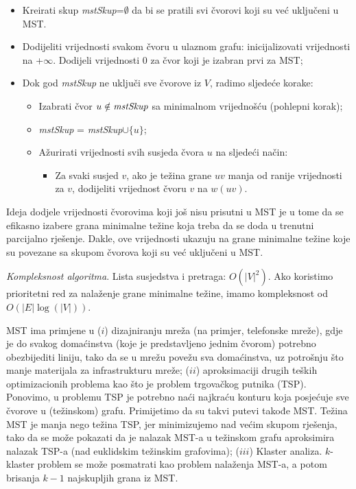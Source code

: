 \documentclass[a4paper, utf8, 11pt, colorlinks]{book}
\begin{document}
\begin{itemize}
	\item Kreirati skup \emph{mstSkup}=$\emptyset$ da bi se pratili svi čvorovi koji su već uključeni u MST.
	\item Dodijeliti vrijednosti svakom čvoru u ulaznom grafu: inicijalizovati vrijednosti na +$\infty$. 
	      Dodijeli vrijednosti 0 za čvor koji je izabran prvi za MST;
	\item Dok god \emph{mstSkup} ne uključi sve čvorove iz $V$, radimo sljedeće korake:
	\begin{itemize}
		\item Izabrati čvor $u\notin\emph{mstSkup} $ sa minimalnom vrijednošću (pohlepni korak);
		\item \emph{mstSkup} = \emph{mstSkup}$\cup \{u\}$;
		\item Ažurirati vrijednosti svih susjeda čvora $u$ na sljedeći način:
		     \begin{itemize}
		     	\item Za svaki susjed $v$, ako je težina grane $uv$ manja od
		             ranije vrijednosti za $v$, dodijeliti vrijednost čvoru $v$ na $w(uv)$. 		    
	         \end{itemize}
	\end{itemize}
\end{itemize}

Ideja dodjele vrijednosti čvorovima koji još nisu prisutni u MST je u tome da se efikasno izabere grana minimalne težine koja treba da se doda u trenutni parcijalno rješenje. Dakle, ove vrijednosti ukazuju na grane minimalne težine koje su povezane sa skupom čvorova koji su već uključeni u MST.

\emph{Kompleksnost algoritma}. Lista susjedstva i pretraga: $O(|V|^2)$. Ako  koristimo prioritetni red za nalaženje grane minimalne težine, imamo kompleksnost od $O( |E| \log(|V|))$. 

MST ima primjene u ($i$) dizajniranju mreža (na primjer, telefonske mreže), gdje je do svakog domaćinstva (koje je predstavljeno jednim čvorom) potrebno obezbijediti liniju, tako da se u mrežu povežu sva domaćinstva, uz potrošnju što manje materijala za infrastrukturu mreže; ($ii$) aproksimaciji drugih teških optimizacionih problema kao što je problem trgovačkog putnika (TSP). Ponovimo, u problemu TSP je potrebno naći najkraću konturu koja posjećuje sve čvorove u (težinskom) grafu. Primijetimo da su takvi putevi takođe MST. Težina MST je manja nego težina TSP, jer minimizujemo nad većim skupom rješenja, tako da se može pokazati da je nalazak MST-a u težinskom grafu aproksimira nalazak TSP-a (nad euklidskim težinskim grafovima); ($iii$) Klaster analiza. $k$-klaster problem  se može posmatrati kao problem nalaženja MST-a, a potom brisanja $k-1$ najskupljih grana iz MST. 
\end{document}
